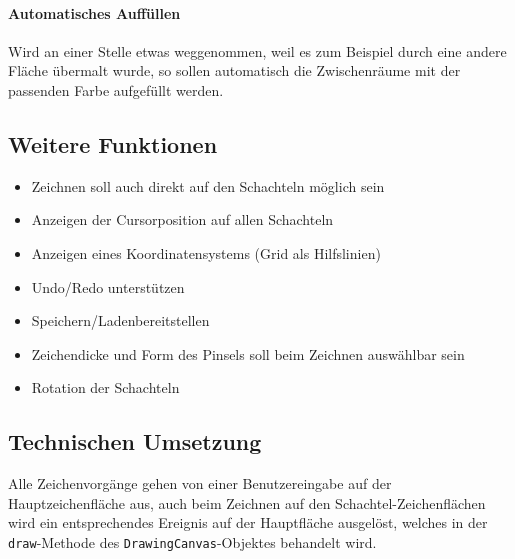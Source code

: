 \paragraph{Automatisches Auffüllen}
Wird an einer Stelle etwas weggenommen, weil es zum Beispiel durch eine andere Fläche übermalt wurde, so sollen automatisch die Zwischenräume mit der passenden Farbe aufgefüllt werden.

\subsection{Weitere Funktionen}
\label{subsec:weiteres}

\begin{itemize}
  \item Zeichnen soll auch direkt auf den Schachteln möglich sein
  \item Anzeigen der Cursorposition auf allen Schachteln
  \item Anzeigen eines Koordinatensystems (Grid als Hilfslinien)
  \item Undo/Redo unterstützen 
  \item Speichern/Ladenbereitstellen
  \item Zeichendicke und Form des Pinsels soll beim Zeichnen auswählbar sein
  \item Rotation der Schachteln
\end{itemize}

\subsection{Technischen Umsetzung}
\label{subsec:funktionsweise}

Alle Zeichenvorgänge gehen von einer Benutzereingabe auf der Hauptzeichenfläche aus, auch beim Zeichnen auf den Schachtel-Zeichenflächen wird ein entsprechendes Ereignis auf der Hauptfläche ausgelöst, welches in der \texttt{draw}-Methode des \texttt{DrawingCanvas}-Objektes behandelt wird.

